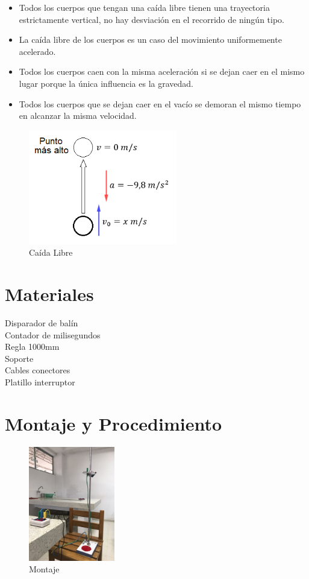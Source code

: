 \documentclass[11pt,twocolumn]{article}
\begin{document}
\begin{itemize}

\item Todos los cuerpos que tengan una caída libre tienen una trayectoria estrictamente vertical, no hay desviación en el recorrido de ningún tipo.

\item La caída libre de los cuerpos es un caso del movimiento uniformemente acelerado.

\item Todos los cuerpos caen con la misma aceleración si se dejan caer en el mismo lugar porque la única influencia es la gravedad.

\item Todos los cuerpos que se dejan caer en el vacío se demoran el mismo tiempo en alcanzar la misma velocidad.

\end{itemize}

\begin{figure}[h]
    \centering
    \includegraphics[width=7 cm, height=5cm]{ImagenI.png}
    \caption{Caída Libre}
    \label{fig:my_label}
\end{figure}


\section{Materiales}
Disparador de balín\\
Contador de milisegundos\\
Regla 1000mm\\
Soporte\\
Cables conectores\\
Platillo interruptor\\

\section{Montaje y Procedimiento}

\begin{figure}[h]
    \centering
    \includegraphics[width=7 cm, height=5cm]{Imagen II.jpeg}
    \caption{Montaje}
    \label{fig:my_label}
\end{figure}
\end{document}
